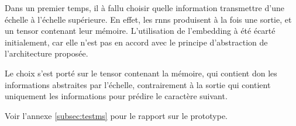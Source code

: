\vspace{1em}
Dans un premier temps, il à fallu choisir quelle information transmettre d'une échelle à l'échelle supérieure. En effet, les \glspl{rnn} produisent à la fois une sortie, et un \gls{tensor} contenant leur mémoire. L'utilisation de l'\gls{embedding} à été écarté initialement, car elle n'est pas en accord avec le principe d'abstraction de l'architecture proposée.

Le choix s'est porté sur le \gls{tensor} contenant la mémoire, qui contient don les informations abstraites par l'échelle, contrairement à la sortie qui  contient uniquement les informations pour prédire le caractère suivant.


Voir l'annexe \ref{subsec:testms} pour le rapport sur le prototype. 